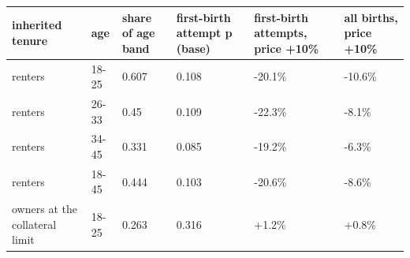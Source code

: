 \begingroup\small
\setlength{\tabcolsep}{3pt}
\renewcommand{\arraystretch}{1.04}
\begin{tabularx}{\linewidth}{XXXXXX}
\toprule
inherited tenure & age & share of age band & first-birth attempt p (base) & first-birth attempts, price +10\% & all births, price +10\% \\
\midrule
renters & 18-25 & 0.607 & 0.108 & -20.1\% & -10.6\% \\
renters & 26-33 & 0.45 & 0.109 & -22.3\% & -8.1\% \\
renters & 34-45 & 0.331 & 0.085 & -19.2\% & -6.3\% \\
renters & 18-45 & 0.444 & 0.103 & -20.6\% & -8.6\% \\
owners at the collateral limit & 18-25 & 0.263 & 0.316 & +1.2\% & +0.8\% \\
\bottomrule
\end{tabularx}
\endgroup
